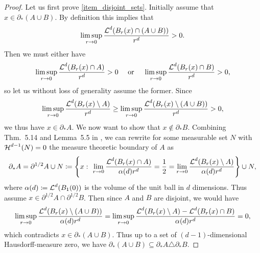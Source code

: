 \begin{proof}
	Let us first prove \cref{item_disjoint_sets}. Initially assume that $ x \in \partial_{ \ast } ( A \cup B ) $. By definition this implies that
	\begin{equation*}
		\limsup_{ r \to 0 }
		\frac{ \operatorname{\mathcal{L}}^{ d } ( B_{ r } ( x ) \cap ( A \cup B ) ) }{ r^{ d } }
		>0.
	\end{equation*}
	Then we must either have
	\begin{equation*}
		\limsup_{ r \to 0 }
		\frac{ \operatorname{\mathcal{L}}^{ d } ( B_{ r } ( x ) \cap A ) }{ r^{ d } }
		>0
		\quad 
		\text{ or }
		\quad
		\limsup_{ r \to 0 }
		\frac{ \operatorname{\mathcal{L}}^{ d } ( B_{ r } ( x ) \cap  B ) }{ r^{ d } }
		>0,
	\end{equation*}
	so let us without loss of generality assume the former. Since
	\begin{equation*}
		\limsup_{ r \to 0 }
		\frac{ \operatorname{\mathcal{L}}^{ d } ( B_{ r } ( x ) \setminus A ) }{ r^{ d } }
		\geq
		\limsup_{ r \to 0 }
		\frac{ \operatorname{\mathcal{L}}^{ d } ( B_{ r } ( x ) \setminus ( A \cup B ) ) }{ r^{ d } }
		>0,
	\end{equation*}
	we thus have $ x \in \partial_{ \ast } A $.
	We now want to show that $ x \notin \partial_{ \ast } B $.
	Combining Thm.~5.14 and Lemma~5.5 in \cite{evans_gariepy_measure_theory_and_fine_props}, we can rewrite for some measurable set $ N $ with $ \operatorname{\mathcal{H}}^{ d- 1 } ( N ) = 0 $ the measure theoretic boundary of $ A $ as
	\begin{equation}
		\label{measure_theoretic_boundary_almost_half_boundary}
		\partial_{ \ast } A 
		=
		\partial^{ 1/2 } A \cup N 
		\coloneqq
		\left\{
		x 
		\, \colon \,
		\lim_{ r \to 0 }
		\frac{ \operatorname{\mathcal{L}}^{ d } ( B_{ r } ( x ) \cap A ) }{ \alpha( d ) r^{ d } }
		=
		\frac{ 1 }{ 2 }
		=
		\lim_{ r \to 0 }
		\frac{ \operatorname{\mathcal{L}}^{ d } ( B_{ r } ( x ) \setminus A ) }{ \alpha( d ) r^{ d } }
		\right\}
		\cup N,
	\end{equation}
	where $ \alpha ( d ) \coloneqq \operatorname{\mathcal{L}}^{ d } ( B_{ 1 } ( 0 ) ) $ is the volume of the unit ball in $ d $ dimensions.
	Thus assume $ x \in \partial^{ 1/2 } A \cap \partial^{ 1/2 } B $. Then since $ A $ and $ B $ are disjoint, we would have
	\begin{equation*}
		\limsup_{ r \to 0 }
		\frac{ \operatorname{\mathcal{L}}^{ d } ( B_{ r } ( x ) \setminus  ( A \cup B ) ) }{ \alpha( d 
		) r^{ d } }
		=
		\limsup_{ r \to 0 }
		\frac{ \operatorname{\mathcal{L}}^{ d } ( B_{ r } ( x ) \setminus A ) - \operatorname{\mathcal{L}}^{ d } ( B_{ r } ( x ) \cap B ) }{ \alpha( d ) r^{ d } }
		=
		0,
	\end{equation*}
	which contradicts $ x \in \partial_{ \ast } ( A \cup B ) $. Thus up to a set of $(d-1)$-dimensional Hausdorff-measure zero, we have 
	$ \partial_{ \ast } ( A \cup B ) \subseteq \partial_{ \ast } A \triangle \partial_{ \ast } B $.
	

\end{proof}
